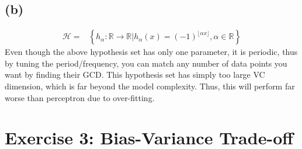 \documentclass[11pt]{article}
\begin{document}
\subsection*{(b)}
\begin{equation}
\begin{split}
\mathcal{H}=&\left\{h_\alpha:\mathbb{R}\rightarrow\mathbb{R}|h_\alpha(x)=(-1)^{\lfloor \alpha x\rfloor},\alpha\in\mathbb{R}\right\}
\end{split}
\end{equation}
Even though the above hypothesis set has only one parameter, it is periodic, thus by tuning the period/frequency, you can match any number of data points you want by finding their GCD.
This hypothesis set has simply too large VC dimension, which is far beyond the model complexity. Thus, this will perform far worse than perceptron due to over-fitting.

\pagebreak
\section*{Exercise 3: Bias-Variance Trade-off}
\end{document}
